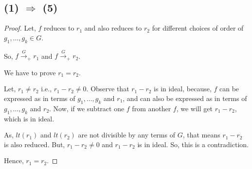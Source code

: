 \subsection{(1) $\Longrightarrow$ (5)}
\begin{proof}
Let, $f$ reduces to $r_1$ and also reduces to $r_2$ for different choices of order of $g_1, \ldots ,g_k \in G$.

So, $ f {\mathop \rightarrow \limits^{G}}_+ r_1$ and $ f {\mathop \rightarrow \limits^{G}}_+ r_2$.

We have to prove $r_1 = r_2$.

Let, $r_1 \neq r_2$ i.e., $r_1 - r_2 \neq 0$.
Observe that $r_1 - r_2$ is in ideal, because, $f$ can be expressed as in terms of $g_1, \ldots ,g_k$ and $r_1$, and can also be expressed as in terms of $g_1, \ldots ,g_k$ and $r_2$. Now, if we subtract one $f$ from another $f$, we will get $r_1 - r_2$, which is in ideal.

As, $lt(r_1)$ and $lt(r_2)$ are not divisible by any terms of $G$, that means $r_1 - r_2$ is also reduced. But, $r_1 - r_2 \neq 0$ and $r_1 - r_2$ is in ideal. So, this is a contradiction.

Hence, $r_1 = r_2$.
\end{proof}

